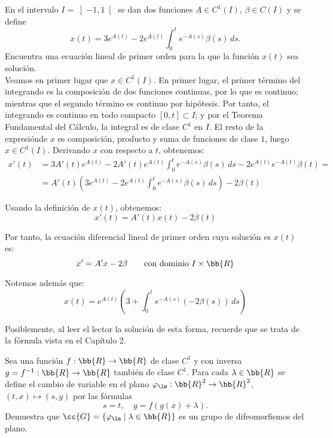 \documentclass[12pt]{article}
\begin{document}
    \begin{ejercicio}
        En el intervalo $I = \left]-1, 1\right[$ se dan dos funciones $A \in C^1(I)$, $\beta \in C(I)$ y se define
        \begin{equation*}
            x(t) = 3e^{A(t)} - 2e^{A(t)}\int_0^t e^{-A(s)}\beta(s)\,ds.
        \end{equation*}
        Encuentra una ecuación lineal de primer orden para la que la función $x(t)$ sea solución.\\

        Veamos en primer lugar que $x\in C^1(I)$. En primer lugar, el primer término del integrando es la composición de dos funciones continuas, por lo que es continuo; mientras que el segundo término es continuo por hipótesis. Por tanto, el integrando es continuo en todo compacto $[0,t]\subset I$; y por el Teorema Fundamental del Cálculo, la integral es de clase $C^1$ en $I$. El resto de la expresiónde $x$ es composición, producto y suma de funciones de clase $1$, luego $x\in C^1(I)$. Derivando $x$ con respecto a $t$, obtenemos:
        \begin{align*}
            x'(t) &= 3A'(t)e^{A(t)} - 2A'(t)e^{A(t)}\int_0^t e^{-A(s)}\beta(s)\,ds - 2e^{A(t)}e^{-A(t)}\beta(t)=\\
            &= A'(t)\left(3e^{A(t)} - 2e^{A(t)}\int_0^t e^{-A(s)}\beta(s)\,ds\right) - 2\beta(t)
        \end{align*}

        Usando la definición de $x(t)$, obtenemos:
        \begin{equation*}
            x'(t) = A'(t)x(t) - 2\beta(t)
        \end{equation*}

        Por tanto, la ecuación diferencial lineal de primer orden cuya solución es $x(t)$ es:
        \begin{equation*}
            x'=A'x-2\beta \qquad \text{con dominio } I\times \bb{R}
        \end{equation*}

        Notemos además que:
        \begin{equation*}
            x(t)=e^{A(t)}\left(3+\int_0^t e^{-A(s)}(-2 \beta(s))\,ds\right)
        \end{equation*}

        Posiblemente, al leer el lector la solución de esta forma, recuerde que se trata de la fórmula vista en el Capítulo 2.
    \end{ejercicio}

    \begin{ejercicio}
        Sea una función $f : \bb{R} \to \bb{R}$ de clase $C^1$ y con inversa $g = f^{-1} : \bb{R} \to \bb{R}$ también de clase $C^1$. Para cada $\lambda \in \bb{R}$ se define el cambio de variable en el plano $\varphi_\lm : \bb{R}^2 \to \bb{R}^2$, $(t, x) \mapsto (s, y)$ por las fórmulas
        \begin{equation*}
            s = t, \quad y = f(g(x) + \lambda).
        \end{equation*}
        Demuestra que $\cc{G} = \{\varphi_\lm \mid \lambda \in \bb{R}\}$ es un grupo de difeomorfismos del plano.
    \end{ejercicio}
\end{document}

